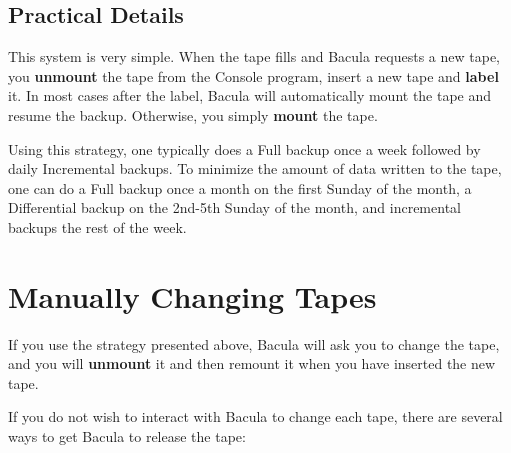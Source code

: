 \subsection{Practical Details}

This system is very simple. When the tape fills and Bacula requests a new
tape, you {\bf unmount} the tape from the Console program, insert a new tape
and {\bf label} it. In most cases after the label, Bacula will automatically
mount the tape and resume the backup. Otherwise, you simply {\bf mount} the
tape. 

Using this strategy, one typically does a Full backup once a week followed by
daily Incremental backups. To minimize the amount of data written to the tape,
one can do a Full backup once a month on the first Sunday of the
month, a Differential backup on the 2nd-5th Sunday of the month, and
incremental backups the rest of the week. 
\label{Manual}

\section{Manually Changing Tapes}

If you use the strategy presented above, Bacula will ask you to change the
tape, and you will {\bf unmount} it and then remount it when you have inserted
the new tape. 

If you do not wish to interact with Bacula to change each tape, there are
several ways to get Bacula to release the tape: 

